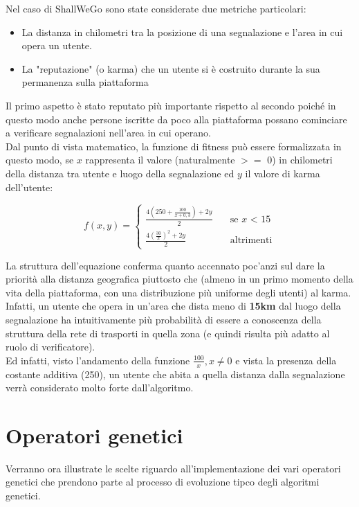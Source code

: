     Nel caso di ShallWeGo sono state considerate due metriche particolari:

    \begin{itemize}
        \item La distanza in chilometri tra la posizione di una segnalazione e l'area in cui opera un utente.
        \item La "reputazione" (o karma) che un utente si è costruito durante la sua permanenza sulla piattaforma
    \end{itemize}

    Il primo aspetto è stato reputato più importante rispetto al secondo poiché in questo modo anche persone iscritte da poco alla piattaforma possano cominciare a verificare segnalazioni nell'area in cui operano. \\
    Dal punto di vista matematico, la funzione di fitness può essere formalizzata in questo modo, se $x$ rappresenta il valore (naturalmente $>=$ 0) in chilometri della distanza tra utente e luogo della segnalazione ed $y$ il valore di karma dell'utente:

    \[ f(x, y) =
  \begin{cases}
    \frac{4(250 + \frac{100}{x+0,3}) + 2y}{2}      & \quad \text{se } x \text{ < 15}\\
    \frac{4(\frac{30}{x})^2 + 2y}{2}  & \quad \text{altrimenti}
  \end{cases}
\]

La struttura dell'equazione conferma quanto accennato poc'anzi sul dare la priorità alla distanza geografica piuttosto che (almeno in un primo momento della vita della piattaforma, con una distribuzione più uniforme degli utenti) al karma. Infatti, un utente che opera in un'area che dista meno di \textbf{15km} dal luogo della segnalazione ha intuitivamente più probabilità di essere a conoscenza della struttura della rete di trasporti in quella zona (e quindi risulta più adatto al ruolo di verificatore). \\
Ed infatti, visto l'andamento della funzione $\frac{100}{x}, x \neq 0$ e vista la presenza della costante additiva (250), un utente che abita a quella distanza dalla segnalazione verrà considerato molto forte dall'algoritmo.

\section{Operatori genetici}
  Verranno ora illustrate le scelte riguardo all'implementazione dei vari operatori genetici che prendono parte al processo di evoluzione tipco degli algoritmi genetici.

